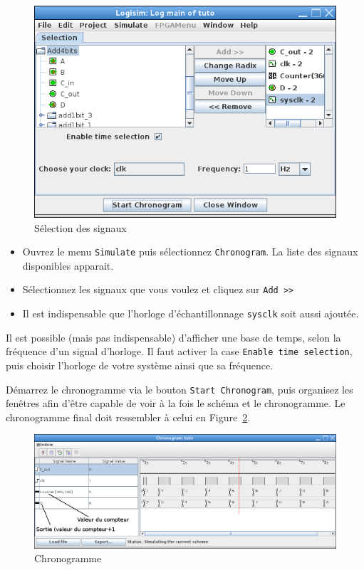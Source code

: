 \documentclass[nosolution]{exercice}
\begin{document}
\begin{figure}[H]
\begin{center}
    \includegraphics[scale=0.5]{images/chronoSelect.png}
\end{center}
\caption{\label{fig_logisim_chrono_selection}Sélection des signaux}
\end{figure}

\begin{itemize}
    \item Ouvrez le menu \texttt{Simulate} puis sélectionnez \texttt{Chronogram}.
        La liste des signaux disponibles apparait.
    \item Sélectionnez les signaux que vous voulez et cliquez sur \texttt{Add >>}
    \item Il est indispensable que l'horloge d'échantillonnage \texttt{sysclk} soit aussi ajoutée.
\end{itemize}

Il est possible (mais pas indispensable) d'afficher une base de temps, selon la fréquence d'un signal d'horloge. Il faut activer la case
\texttt{Enable time selection}, puis choisir l'horloge de votre système ainsi que sa fréquence.

Démarrez le chronogramme via le bouton \texttt{Start Chronogram}, puis organisez les fenêtres afin
d'être capable de voir à la fois le schéma et le chronogramme.
Le chronogramme final doit ressembler à celui en Figure~\ref{fig_logisim_chronogram}.

\begin{figure}[H]
\begin{center}
\includegraphics[width=450pt]{images/chrono.png}
\caption{\label{fig_logisim_chronogram}Chronogramme}
\end{center}
\end{figure}
\end{document}
